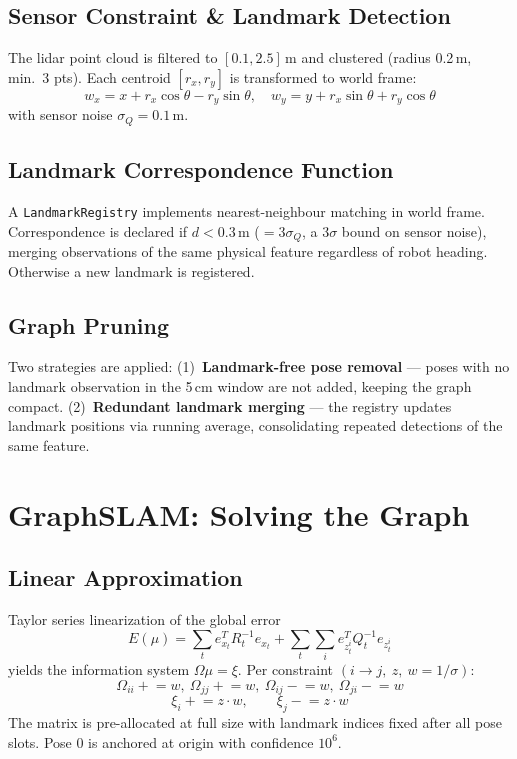 \documentclass[8pt,a4paper,twocolumn]{article}
\begin{document}
\subsection{Sensor Constraint \& Landmark Detection}
The lidar point cloud is filtered to $[0.1,2.5]$\,m and clustered (radius 0.2\,m, min.\ 3 pts). Each centroid $[r_x,r_y]$ is transformed to world frame:
\[
w_x = x + r_x\cos\theta - r_y\sin\theta,\quad w_y = y + r_x\sin\theta + r_y\cos\theta
\]
with sensor noise $\sigma_Q = 0.1$\,m.

\subsection{Landmark Correspondence Function}
A \texttt{LandmarkRegistry} implements nearest-neighbour matching in world frame. Correspondence is declared if $d < 0.3$\,m ($= 3\sigma_Q$, a $3\sigma$ bound on sensor noise), merging observations of the same physical feature regardless of robot heading. Otherwise a new landmark is registered.

\subsection{Graph Pruning}
Two strategies are applied: (1)~\textbf{Landmark-free pose removal} --- poses with no landmark observation in the 5\,cm window are not added, keeping the graph compact. (2)~\textbf{Redundant landmark merging} --- the registry updates landmark positions via running average, consolidating repeated detections of the same feature.

\section{GraphSLAM: Solving the Graph}

\subsection{Linear Approximation}
Taylor series linearization of the global error
\[
E(\mu)=\sum_t e_{x_t}^T R_t^{-1} e_{x_t} + \sum_t\sum_i e_{z_t^i}^T Q_t^{-1} e_{z_t^i}
\]
yields the information system $\Omega\mu=\xi$. Per constraint $(i\to j,\ z,\ w=1/\sigma)$:
\[
\Omega_{ii}\mathrel{+}=w,\ \Omega_{jj}\mathrel{+}=w,\ \Omega_{ij}\mathrel{-}=w,\ \Omega_{ji}\mathrel{-}=w
\]
\[
\xi_i\mathrel{+}=z{\cdot}w,\qquad \xi_j\mathrel{-}=z{\cdot}w
\]
The matrix is pre-allocated at full size with landmark indices fixed after all pose slots. Pose 0 is anchored at origin with confidence $10^6$.
\end{document}
